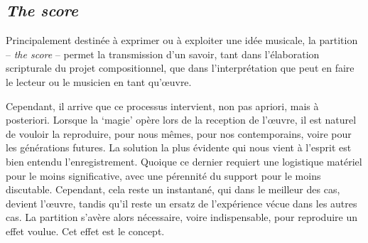 \documentclass{article}
\begin{document}
%
%
%
%
%

\subsection{\textsl{The score}}

Principalement destinée à exprimer ou à exploiter une idée musicale, la partition -- \textsl{the score} -- permet la transmission d'un savoir, tant dans l'élaboration scripturale du projet compositionnel, que dans l'interprétation que peut en faire le lecteur ou le musicien en tant qu'œuvre.

Cependant, il arrive que ce processus intervient, non pas apriori, mais à posteriori.
Lorsque la `magie' opère lors de la reception de l'œuvre, il est naturel de vouloir la reproduire, pour nous mêmes, pour nos contemporains, voire pour les générations futures. La solution la plus évidente qui nous vient à l'esprit est bien entendu l'enregistrement. Quoique ce dernier requiert une logistique matériel pour le moins significative, avec une pérennité du support pour le moins discutable. Cependant, cela reste un instantané, qui dans le meilleur des cas, devient l'œuvre, tandis qu'il reste un ersatz de l'expérience vécue dans les autres cas. La partition s'avère alors nécessaire, voire indispensable, pour reproduire un effet voulue. Cet effet est le concept.
\end{document}
